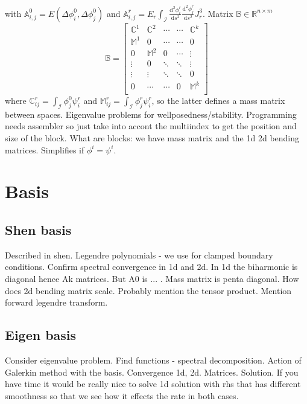 \documentclass{marine_2015}
\newcommand{\Bmat}{\ensuremath{\mathbb{B}}}
\newcommand{\inner}[2]{\ensuremath{\left(#1, #2\right)}}
\newcommand{\deriv}[2]{\ensuremath{\frac{\mathrm{d}#1}{\mathrm{d}#2}}}
\begin{document}
with $\mathbb{A}^0_{i, j}=E\inner{\Delta \phi^0_i}{\Delta\phi^0_j}$ and
$\mathbb{A}^r_{i, j}=E_r\displaystyle\int_{\mathcal{I}}
\deriv{^2\phi^r_i}{s^2}\deriv{^2\phi^r_j}{s^2}J_r^3$. Matrix
$\Bmat\in\mathbb{R}^{n\times m}$
\[
    \mathbb{B}=
    \begin{bmatrix}
      \mathbb{C}^1 & \mathbb{C}^2 & \cdots & \cdots & \mathbb{C}^k\\
      \mathbb{M}^1   &        0       & \cdots & \cdots &        0      \\
           0         & \mathbb{M}^2   &    0   & \cdots &   \vdots      \\
         \vdots      &       0        & \ddots & \ddots &   \vdots      \\
         \vdots      &     \vdots      & \ddots & \ddots &       0      \\
      0         &  \cdots        & \cdots & 0      &   \mathbb{M}^k     \\
    \end{bmatrix}
\]
where $\mathbb{C}^r_{ij}=\int_{\mathcal{I}}\phi^0_j\psi^r_i$ and
$\mathbb{M}^r_{ij}=\int_{\mathcal{I}}\phi^r_j\psi^r_i$, so the latter defines
a mass matrix between spaces.
Eigenvalue problems for wellposedness/stability. Programming needs assembler
so just take into accont the multiindex to get the position and size of the
block. What are blocks: we have mass matrix and the 1d 2d bending matrices.
Simplifies if $\phi^i=\psi^i$.

\section{Basis}
\subsection{Shen basis}
Described in shen. Legendre polynomials - we use for clamped boundary
conditions. Confirm spectral convergence in 1d and 2d. In 1d the biharmonic is
diagonal hence Ak matrices. But A0 is ... . Mass matrix is penta diagonal. How
does 2d bending matrix scale. Probably mention the tensor product. Mention
forward legendre transform.
\subsection{Eigen basis}
Consider eigenvalue problem. Find functions - spectral decomposition. Action of
Galerkin method with the basis. Convergence 1d, 2d. Matrices. Solution. If you
have time it would be really nice to solve 1d solution with rhs that has
different smoothness so that we see how it effects the rate in both cases.
\end{document}
